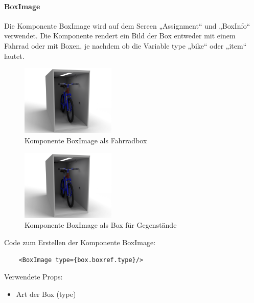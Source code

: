 \paragraph{BoxImage}Die Komponente BoxImage wird auf dem Screen „Assignment“ und „BoxInfo“ verwendet. Die Komponente rendert ein Bild der Box entweder mit einem Fahrrad oder mit Boxen, je nachdem ob die Variable type „bike“ oder „item“ lautet.\\
\begin{figure}[H]
    \centering
    \includegraphics[width=0.4\textwidth]{images/box_bike.png}
    \caption{Komponente BoxImage als Fahrradbox}
    \label{fig:boximagebike}
\end{figure}
\begin{figure}[H]
    \centering
    \includegraphics[width=0.4\textwidth]{images/box_bike.png}
    \caption{Komponente BoxImage als Box für Gegenstände}
    \label{fig:boximageitem}
\end{figure}
Code zum Erstellen der Komponente BoxImage:\\
\begin{verbatim}
    <BoxImage type={box.boxref.type}/>
\end{verbatim}
Verwendete Props:
\begin{itemize}
    \item Art der Box (type)
\end{itemize}

